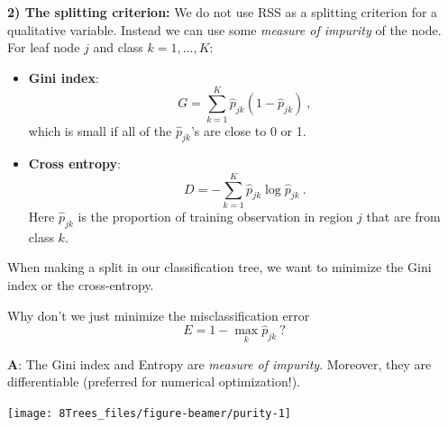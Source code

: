 \documentclass[10pt,ignorenonframetext,]{beamer}
\providecommand{\tightlist}{%
  \setlength{\itemsep}{0pt}\setlength{\parskip}{0pt}}
\begin{document}
\begin{frame}

\textbf{2) The splitting criterion:} We do not use RSS as a splitting
criterion for a qualitative variable. Instead we can use some
\emph{measure of impurity} of the node. For leaf node \(j\) and class
\(k=1,\ldots, K\):

\begin{itemize}
\tightlist
\item
  \textbf{Gini index}: \[
  G=\sum_{k=1}^K \hat{p}_{jk}(1-\hat{p}_{jk}) \ ,
  \] which is small if all of the \(\hat{p}_{jk}\)'s are close to 0 or
  1.
\end{itemize}

\vspace{1mm}

\begin{itemize}
\tightlist
\item
  \textbf{Cross entropy}: \[
  D=-\sum_{k=1}^K \hat{p}_{jk}\log\hat{p}_{jk} \ .
  \] Here \(\hat{p}_{jk}\) is the proportion of training observation in
  region \(j\) that are from class \(k\).
\end{itemize}

When making a split in our classification tree, we want to minimize the
Gini index or the cross-entropy.

\end{frame}

\begin{frame}

Why don't we just minimize the misclassification error
\[E= 1- \max_k{\hat{p}_{jk}} \ ?\]

\textbf{A}: The Gini index and Entropy are \emph{measure of impurity}.
Moreover, they are differentiable (preferred for numerical
optimization!).

\begin{center}\texttt{[image: 8Trees\_files/figure-beamer/purity-1]} \end{center}

\end{frame}
\end{document}
